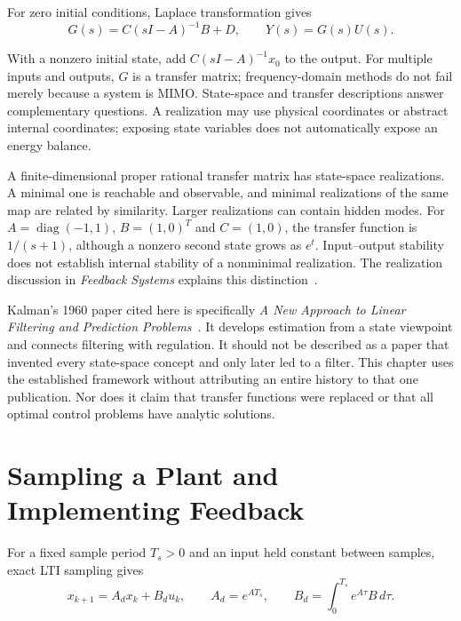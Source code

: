 For zero initial conditions, Laplace transformation gives
\begin{equation}
\label{eq:transfer_function_def}
 G(s)=C(sI-A)^{-1}B+D,\qquad Y(s)=G(s)U(s).
\end{equation}

With a nonzero initial state, add $C(sI-A)^{-1}x_0$ to the output. For multiple inputs and outputs, $G$ is a transfer matrix; frequency-domain methods do not fail merely because a system is MIMO. State-space and transfer descriptions answer complementary questions. A realization may use physical coordinates or abstract internal coordinates; exposing state variables does not automatically expose an energy balance.

A finite-dimensional proper rational transfer matrix has state-space realizations. A minimal one is reachable and observable, and minimal realizations of the same map are related by similarity. Larger realizations can contain hidden modes. For $A=\operatorname{diag}(-1,1)$, $B=(1,0)^T$ and $C=(1,0)$, the transfer function is $1/(s+1)$, although a nonzero second state grows as $e^t$. Input--output stability does not establish internal stability of a nonminimal realization. The realization discussion in \emph{Feedback Systems} explains this distinction~\cite{AstromMurrayTransferNotes}.

Kalman's 1960 paper cited here is specifically \emph{A New Approach to Linear Filtering and Prediction Problems}~\cite{Kalman1960}. It develops estimation from a state viewpoint and connects filtering with regulation. It should not be described as a paper that invented every state-space concept and only later led to a filter. This chapter uses the established framework without attributing an entire history to that one publication. Nor does it claim that transfer functions were replaced or that all optimal control problems have analytic solutions.

\section{Sampling a Plant and Implementing Feedback}
\label{sec:discrete_time}
\label{def:discrete_ss}
\label{eq:discrete_state}
\label{eq:discrete_stability}
\label{thm:discrete_stability}
\label{laymans:discrete_practical}

For a fixed sample period $T_s>0$ and an input held constant between samples, exact LTI sampling gives
\begin{equation}
\label{eq:exact_discretization}
 x_{k+1}=A_dx_k+B_du_k,\qquad A_d=e^{AT_s},\qquad
 B_d=\int_0^{T_s}e^{A\tau}B\,d\tau.
\end{equation}

